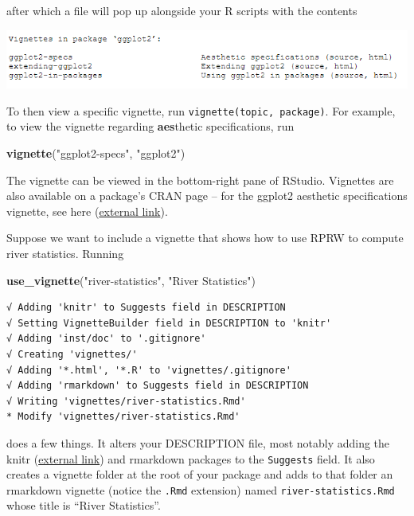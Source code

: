 \documentclass[
]{book}
\newenvironment{Shaded}{\begin{snugshade}}{\end{snugshade}}
\newcommand{\KeywordTok}[1]{\textcolor[rgb]{0.13,0.29,0.53}{\textbf{#1}}}
\newcommand{\NormalTok}[1]{#1}
\newcommand{\StringTok}[1]{\textcolor[rgb]{0.31,0.60,0.02}{#1}}
\begin{document}
after which a file will pop up alongside your R scripts with the contents

\includegraphics[width=1\linewidth]{images/newrpack_files6}

To then view a specific vignette, run \texttt{vignette(topic,\ package)}. For example, to view the vignette regarding \textbf{aes}thetic specifications, run

\begin{Shaded}
\begin{Highlighting}[]
\KeywordTok{vignette}\NormalTok{(}\StringTok{"ggplot2-specs"}\NormalTok{, }\StringTok{"ggplot2"}\NormalTok{)}
\end{Highlighting}
\end{Shaded}

The vignette can be viewed in the bottom-right pane of RStudio. Vignettes are also available on a package's CRAN page -- for the ggplot2 aesthetic specifications vignette, see here (\href{https://cran.r-project.org/web/packages/ggplot2/vignettes/ggplot2-specs.html}{external link}).

Suppose we want to include a vignette that shows how to use RPRW to compute river statistics. Running

\begin{Shaded}
\begin{Highlighting}[]
\KeywordTok{use_vignette}\NormalTok{(}\StringTok{"river-statistics"}\NormalTok{, }\StringTok{"River Statistics"}\NormalTok{)}
\end{Highlighting}
\end{Shaded}

\begin{verbatim}
√ Adding 'knitr' to Suggests field in DESCRIPTION
√ Setting VignetteBuilder field in DESCRIPTION to 'knitr'
√ Adding 'inst/doc' to '.gitignore'
√ Creating 'vignettes/'
√ Adding '*.html', '*.R' to 'vignettes/.gitignore'
√ Adding 'rmarkdown' to Suggests field in DESCRIPTION
√ Writing 'vignettes/river-statistics.Rmd'
* Modify 'vignettes/river-statistics.Rmd'
\end{verbatim}

does a few things. It alters your DESCRIPTION file, most notably adding the knitr (\href{https://yihui.org/knitr/}{external link}) and rmarkdown packages to the \texttt{Suggests} field. It also creates a vignette folder at the root of your package and adds to that folder an rmarkdown vignette (notice the \texttt{.Rmd} extension) named \texttt{river-statistics.Rmd} whose title is ``River Statistics''.
\end{document}
